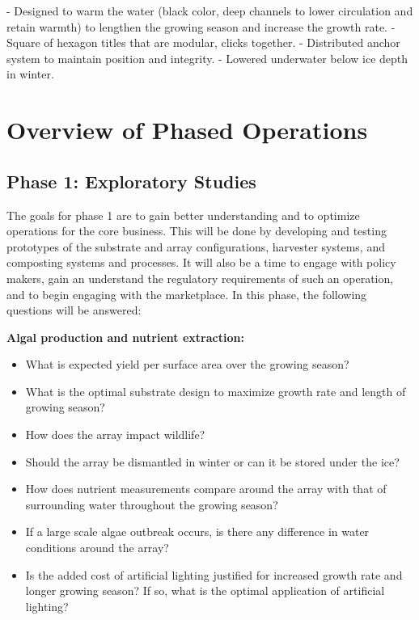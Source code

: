 \documentclass{article}
\begin{document}
  - Designed to warm the water (black color, deep channels to lower circulation and retain warmth) to lengthen the growing season and increase the growth rate.
  - Square of hexagon titles that are modular, clicks together.
  - Distributed anchor system to maintain position and integrity.
  - Lowered underwater below ice depth in winter.


\section{Overview of Phased Operations}

\subsection{Phase 1: Exploratory Studies}

The goals for phase 1 are to gain better understanding and to optimize
operations for the core business.  This will be done by
developing and testing prototypes of the substrate and array configurations,
harvester systems, and composting systems and processes.
It will also be a time to engage with policy makers,
gain an understand the regulatory requirements of such an operation,
and to begin engaging with the marketplace.
In this phase, the following questions will be answered:

\textbf{Algal production and nutrient extraction:}
\begin{itemize}
  \item{What is expected yield per surface area over the growing season?}
  \item{What is the optimal substrate design to maximize growth rate and length of growing season?}
  \item{How does the array impact wildlife?}
  \item{Should the array be dismantled in winter or can it be stored under the ice?}
  \item{How does nutrient measurements compare around the array with that of surrounding water throughout the growing season?}
  \item{If a large scale algae outbreak occurs, is there any difference in water conditions around the array?}
  \item{Is the added cost of artificial lighting justified for increased growth rate and longer growing season?
        If so, what is the optimal application of artificial lighting?}
\end{itemize}
\end{document}
